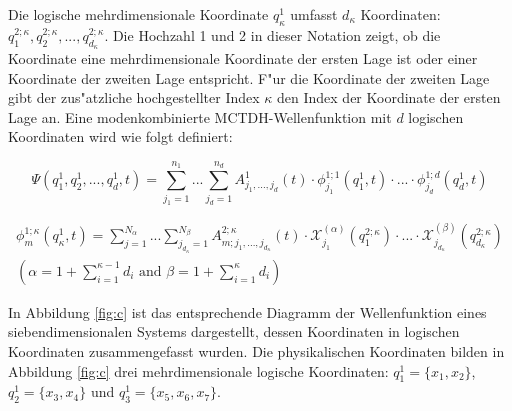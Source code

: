 Die logische mehrdimensionale Koordinate $ q^1_\kappa $ umfasst $d_\kappa $ Koordinaten:  $q^{2;\kappa}_1, q^{2;\kappa}_2, ..., q^{2;\kappa}_{d_\kappa} $.
Die Hochzahl 1 und 2 in dieser Notation zeigt, ob die Koordinate eine mehrdimensionale Koordinate der ersten Lage ist oder einer Koordinate
der zweiten Lage entspricht. F"ur die Koordinate der zweiten Lage gibt der zus"atzliche hochgestellter Index $\kappa$
den Index der Koordinate der ersten Lage an.
Eine modenkombinierte MCTDH-Wellenfunktion mit $d$ logischen Koordinaten wird wie folgt definiert:

\begin{equation}
 \Psi(q^{1}_{1},q^{1}_{2},..., q^{1}_{d}, t)=\sum^{n_{1}}_{j_{1}=1} ... \sum^{n_{d}}_{j_{d}=1} A^{1}_{j_{1}, ..., j_{d}}(t)
 \cdot \phi^{1;1}_{j_{1}}(q^1_{1}, t) \cdot ... \cdot \phi^{1;d}_{j_{d}}(q^1_{d}, t)
 \label{Eq:mode_comb_wave}
 \end{equation}

\begin{equation}
  \begin{gathered}
 \phi^{1;\kappa}_{m} (q^1_{\kappa}, t)=\sum^{N_{\alpha}}_{j=1} ... \sum^{N_{\beta}}_{j_{d_\kappa}=1} A^{2;\kappa}_{m;j_1,...,j_{d_\kappa}}(t)
 \cdot \mathcal{X}^{(\alpha)}_{j_1}(q^{2;\kappa}_1) \cdot ... \cdot
 \mathcal{X}^{(\beta)}_{j_{d_\kappa}}(q^{2;\kappa}_{d_\kappa})\\
 \left( \alpha = 1 + \sum^{\kappa - 1}_{i=1}d_i \text{ and }  \beta = 1 + \sum^{\kappa}_{i=1}d_i\right)
 \label{Eq:mode_SPF}
\end{gathered}
 \end{equation}

In Abbildung \ref{fig:c} ist das entsprechende Diagramm der Wellenfunktion eines siebendimensionalen Systems dargestellt, dessen Koordinaten 
in logischen Koordinaten zusammengefasst wurden.
Die physikalischen Koordinaten bilden in Abbildung \ref{fig:c} drei mehrdimensionale logische Koordinaten:
 $q^{1}_{1} = \{x_1, x_2\}$, $ q^{1}_{2} = \{x_3, x_4\}$
und $ q^{1}_{3} = \{x_5, x_6, x_7\}$.


